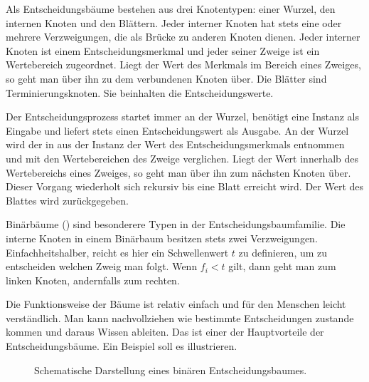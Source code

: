 Als Entscheidungsbäume bestehen aus drei Knotentypen: einer Wurzel, den internen Knoten und den Blättern. 
Jeder interner Knoten hat stets eine oder mehrere Verzweigungen, die als Brücke zu anderen Knoten dienen. 
Jeder interner Knoten ist einem Entscheidungsmerkmal und jeder seiner Zweige ist ein Wertebereich zugeordnet. 
Liegt der Wert des Merkmals im Bereich eines Zweiges, so geht man über ihn zu dem verbundenen Knoten über. 
Die Blätter sind Terminierungsknoten. 
Sie beinhalten die Entscheidungswerte. 

Der Entscheidungsprozess startet immer an der Wurzel, benötigt eine Instanz als Eingabe und liefert stets einen Entscheidungswert als Ausgabe. 
An der Wurzel wird der in aus der Instanz der Wert des Entscheidungsmerkmals entnommen und mit den Wertebereichen des Zweige verglichen. 
Liegt der Wert innerhalb des Wertebereichs eines Zweiges, so geht man über ihn zum nächsten Knoten über. 
Dieser Vorgang wiederholt sich rekursiv bis eine Blatt erreicht wird. Der Wert des Blattes wird zurückgegeben. 

Binärbäume () sind besonderere Typen in der Entscheidungsbaumfamilie.
Die interne Knoten in einem Binärbaum besitzen stets zwei Verzweigungen.
Einfachheitshalber, reicht es hier ein Schwellenwert $t$ zu definieren, um zu entscheiden welchen Zweig man folgt.
Wenn $f_i < t$ gilt, dann geht man zum linken Knoten, andernfalls zum rechten.

Die Funktionsweise der Bäume ist relativ einfach und für den Menschen leicht verständlich. 
Man kann nachvollziehen wie bestimmte Entscheidungen zustande kommen und daraus Wissen ableiten. 
Das ist einer der Hauptvorteile der Entscheidungsbäume. 
Ein Beispiel soll es illustrieren.

\begin{figure}[ht]
	\centering
	
	\caption{Schematische Darstellung eines binären Entscheidungsbaumes.}
	\label{fig:bas:decision_tree}
\end{figure}

